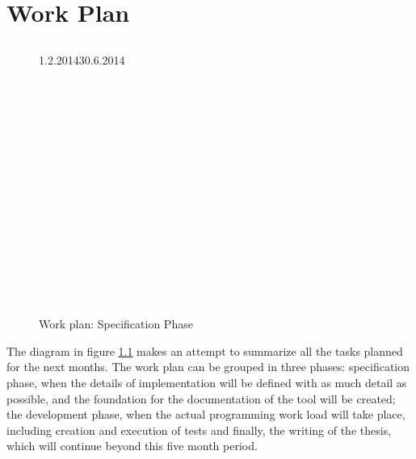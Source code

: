 \chapter{Work Plan}
\label{chap:plan}

\section*{}

\begin{figure}
	\caption{Work plan: Specification Phase}
	\label{dia:gantt}
	\begin{ganttchart}[
		x unit=0.004\textwidth,
		time slot format=little-endian
		]{1.2.2014}{30.6.2014}
		 \\
		 \\

		 \\
		 \\
		 \\
		 \\
		 \\

		 \\
		 \\
		 \\
		 \\
		 \\

		 \\
		 \\
		 \\
		 \\
	\end{ganttchart}
\end{figure}

The diagram in figure \ref{dia:gantt} makes an attempt to summarize all the tasks planned for the next months. The work plan can be grouped in three phases: specification phase, when the details of implementation will be defined with as much detail as possible, and the foundation for the documentation of the tool will be created; the development phase, when the actual programming work load will take place, including creation and execution of tests and finally, the writing of the thesis, which will continue beyond this five month period.

